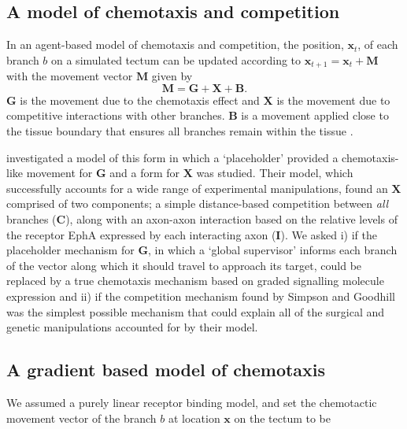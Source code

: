 \documentclass[11pt, a4paper]{article}
\begin{document}
\subsection*{A model of chemotaxis and competition}

In an agent-based model of chemotaxis and competition, the position, $\mathbf{x}_t$, of each branch $b$ on a simulated tectum can be updated according to $\mathbf{x}_{t+1} = \mathbf{x}_{t} + \mathbf{M}$ with the movement vector $\mathbf{M}$ given by
\begin{equation} \label{e:mv2}
 \mathbf{M} = \mathbf{G} +  \mathbf{X} + \mathbf{B}.
\end{equation}
$\mathbf{G}$ is the movement due to the chemotaxis effect and $\mathbf{X}$ is the movement due to competitive interactions with other branches. 
$\mathbf{B}$ is a movement applied close to the tissue boundary that ensures all branches remain within the tissue \citep{holt_target_1998}.

\citet{simpson_simple_2011} investigated a model of this form in which a `placeholder' provided a chemotaxis-like movement for $\mathbf{G}$ and a form for $\mathbf{X}$ was studied.
Their model, which successfully accounts for a wide range of experimental manipulations, found an $\mathbf{X}$ comprised of two components; a simple distance-based competition between \emph{all} branches ($\mathbf{C}$), along with an axon-axon interaction based on the relative levels of the receptor EphA expressed by each interacting axon ($\mathbf{I}$).  
We asked i) if the placeholder mechanism for $\mathbf{G}$, in which a `global supervisor' informs each branch of the vector along which it should travel to approach its target, could be replaced by a true chemotaxis mechanism based on graded signalling molecule expression and ii) if the competition mechanism found by Simpson and Goodhill was the simplest possible mechanism that could explain all of the surgical and genetic manipulations accounted for by their model.

\subsection*{A gradient based model of chemotaxis}

We assumed a purely linear receptor binding model, and set the chemotactic movement vector of the branch $b$ at location $\mathbf{x}$ on the tectum to be
\end{document}
